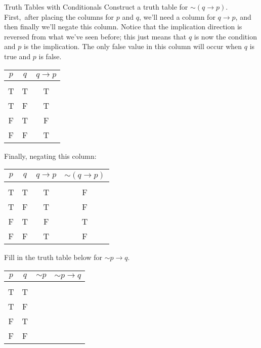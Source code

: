 \begin{example}[https://www.youtube.com/watch?v=Tx2r1SRMsKc]{Truth Tables with Conditionals}
Construct a truth table for $\sim (q \to p)$.\\

First,\sol\ after placing the columns for $p$ and $q$, we'll need a column for $q \to p$, and then finally we'll negate this column.  Notice that the implication direction is reversed from what we've seen before; this just means that $q$ is now the condition and $p$ is the implication.  The only false value in this column will occur when $q$ is true and $p$ is false.
\begin{center}
\begin{tabular}{|c c c|}
\hline
$p$ & $q$ & $q \to p$\\
\hline
& & \\
T & T & T\\
T & F & T\\
F & T & F\\
F & F & T\\
\hline
\end{tabular}
\end{center}

Finally, negating this column:
\begin{center}
{\color{green!30!black}
\begin{tabular}{|c c c c|}
\hline
$p$ & $q$ & $q \to p$ & $\sim (q \to p)$\\
\hline
& & &\\
T & T & T & F\\
T & F & T & F\\
F & T & F & T\\
F & F & T & F\\
\hline
\end{tabular}}
\end{center}
\end{example}

\begin{try}
Fill in the truth table below for $\sim p \to q$.
\begin{center}
\begin{tabular}{|c c c c|}
\hline
$p$ & $q$ & $\sim p$ & $\sim p \to q$\\
\hline
& && \\
T & T & &\\
T & F & &\\
F & T & &\\
F & F & &\\
\hline
\end{tabular}
\end{center}
\end{try}


